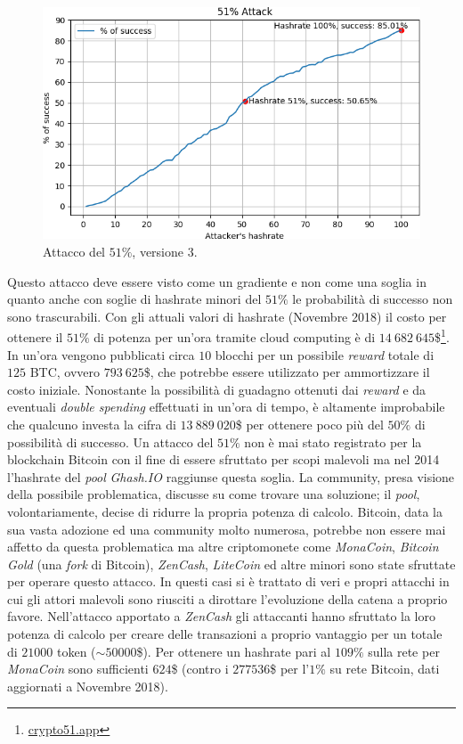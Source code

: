 \begin{figure}[H]
    \centering
    \includegraphics[width=\textwidth]{./images/51-v3.png}
    \caption{Attacco del $51\%$, versione 3.}
    \label{fig:51v3}
\end{figure}
Questo attacco deve essere visto come un gradiente e non come una soglia in quanto anche con soglie di hashrate minori del $51\%$ le probabilità di successo non sono trascurabili. Con gli attuali valori di hashrate (Novembre 2018) il costo per ottenere il $51\%$ di potenza per un'ora tramite cloud computing è di $14~682~645$\$\footnote{\href{https://www.crypto51.app/}{crypto51.app}}. In un'ora vengono pubblicati circa $10$ blocchi per un possibile \textit{reward} totale di $125$ BTC, ovvero $793~625$\$, che potrebbe essere utilizzato per ammortizzare il costo iniziale. Nonostante la possibilità di guadagno ottenuti dai \textit{reward} e da eventuali \textit{double spending} effettuati in un'ora di tempo, è altamente improbabile che qualcuno investa la cifra di $13~889~020$\$ per ottenere poco più del $50\%$ di possibilità di successo.\newline
Un attacco del $51\%$ non è mai stato registrato per la blockchain Bitcoin con il fine di essere sfruttato per scopi malevoli ma nel 2014 l'hashrate del \textit{pool} \textit{Ghash.IO} raggiunse questa soglia. La community, presa visione della possibile problematica, discusse su come trovare una soluzione; il \textit{pool}, volontariamente, decise di ridurre la propria potenza di calcolo. Bitcoin, data la sua vasta adozione ed una community molto numerosa, potrebbe non essere mai affetto da questa problematica ma altre criptomonete come \textit{MonaCoin}, \textit{Bitcoin Gold} (una \textit{fork} di Bitcoin), \textit{ZenCash}, \textit{LiteCoin} ed altre minori sono state sfruttate per operare questo attacco. In questi casi si è trattato di veri e propri attacchi in cui gli attori malevoli sono riusciti a dirottare l'evoluzione della catena a proprio favore. Nell'attacco apportato a \textit{ZenCash} gli attaccanti hanno sfruttato la loro potenza di calcolo per creare delle transazioni a proprio vantaggio per un totale di $21000$ token ($\sim50000$\$). Per ottenere un hashrate pari al $109\%$ sulla rete per \textit{MonaCoin} sono sufficienti $624$\$ (contro i $277536$\$ per l'$1\%$ su rete Bitcoin, dati aggiornati a Novembre 2018).

